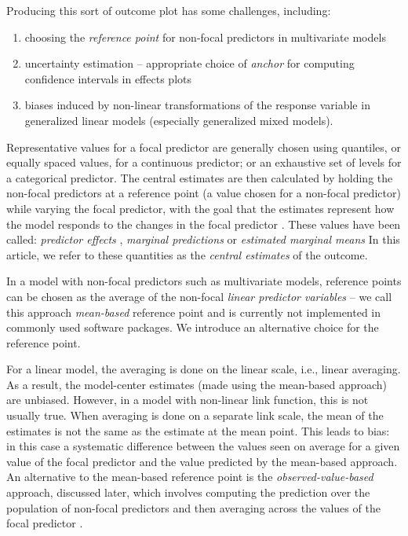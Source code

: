 Producing this sort of outcome plot has some challenges, including:
\begin{enumerate}
\item choosing the \emph{reference point} for non-focal predictors in multivariate models
\item uncertainty estimation -- appropriate choice of \emph{anchor} for computing confidence intervals in effects plots
\item biases induced by non-linear transformations of the response variable in generalized linear models (especially generalized mixed models).
\end{enumerate}

Representative values for a focal predictor are generally chosen using quantiles, or equally spaced values, for a continuous predictor; or an exhaustive set of levels for a categorical predictor.
The central estimates are then calculated by holding the non-focal predictors at a reference point (a value chosen for a non-focal predictor) while varying the focal predictor, with the goal that the estimates represent how the model responds to the changes in the focal predictor \citep{fox2009effect, hanmer2013behind}. These values have been called: \emph{predictor effects} \citep{fox2009effect}, \emph{marginal predictions} \citep{leeper2017package} or \emph{estimated marginal means} \citep{lenth2018package} In this article, we refer to these quantities as the \emph{central estimates} of the outcome. 


In a model with non-focal predictors such as multivariate models, reference points can be chosen as the average of the non-focal \emph{linear predictor variables} -- we call this approach \emph{mean-based} reference point and is currently not implemented in commonly used  software packages. We introduce an alternative choice for the reference point.

For a linear model, the averaging is done on the linear scale, i.e., linear averaging. As a result, the model-center estimates (made using the mean-based approach) are unbiased. 
However, in a model with non-linear link function, this is not usually true. When averaging is done on a separate link scale, the mean of the estimates is not the same as the estimate at the mean point. 
This leads to bias: in this case a systematic difference between the values seen on average for a given value of the focal predictor and the value predicted by the mean-based approach. 
An alternative to the mean-based reference point is the \emph{observed-value-based} approach, discussed later, which involves computing the prediction over the population of non-focal predictors and then averaging across the values of the focal predictor \citep{hanmer2013behind}. 

